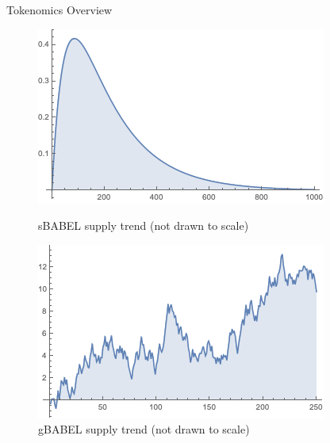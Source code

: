 \documentclass{beamer}
\begin{document}
\begin{frame}{Tokenomics Overview}
\begin{figure}
\begin{minipage}{.25\textwidth}
            \includegraphics[width=\linewidth]{images/Fig2.png}
            \caption{{\scriptsize sBABEL supply trend (not drawn to scale)}}
        \end{minipage}
\hfill
        \begin{minipage}{.25\textwidth}
            \centering
            \includegraphics[width=\linewidth]{images/Fig3.png}
            \caption{{\scriptsize gBABEL supply trend (not drawn to scale)}}
        \end{minipage}       
\hfill
    \end{figure}
\end{frame}
\end{document}
